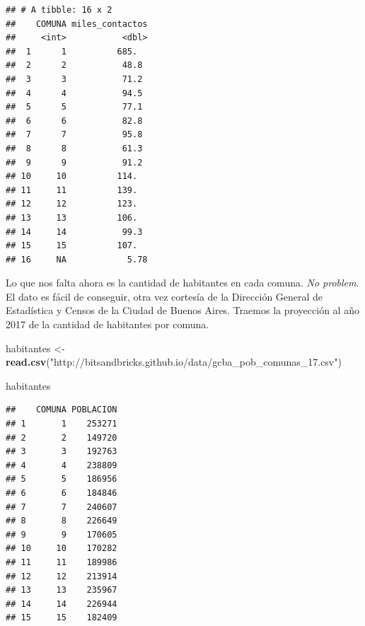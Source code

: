 \documentclass[spanish,]{book}
\newenvironment{Shaded}{\begin{snugshade}}{\end{snugshade}}
\newcommand{\DataTypeTok}[1]{\textcolor[rgb]{0.13,0.29,0.53}{#1}}
\newcommand{\DecValTok}[1]{\textcolor[rgb]{0.00,0.00,0.81}{#1}}
\newcommand{\KeywordTok}[1]{\textcolor[rgb]{0.13,0.29,0.53}{\textbf{#1}}}
\newcommand{\NormalTok}[1]{#1}
\newcommand{\OperatorTok}[1]{\textcolor[rgb]{0.81,0.36,0.00}{\textbf{#1}}}
\newcommand{\StringTok}[1]{\textcolor[rgb]{0.31,0.60,0.02}{#1}}
\begin{document}
\begin{Shaded}
\end{Shaded}

\begin{verbatim}
## # A tibble: 16 x 2
##    COMUNA miles_contactos
##     <int>           <dbl>
##  1      1          685.  
##  2      2           48.8 
##  3      3           71.2 
##  4      4           94.5 
##  5      5           77.1 
##  6      6           82.8 
##  7      7           95.8 
##  8      8           61.3 
##  9      9           91.2 
## 10     10          114.  
## 11     11          139.  
## 12     12          123.  
## 13     13          106.  
## 14     14           99.3 
## 15     15          107.  
## 16     NA            5.78
\end{verbatim}

Lo que nos falta ahora es la cantidad de habitantes en cada comuna. \emph{No problem}. El dato es fácil de conseguir, otra vez cortesía de la Dirección General de Estadística y Censos de la Ciudad de Buenos Aires. Traemos la proyección al año 2017 de la cantidad de habitantes por comuna.

\begin{Shaded}
\begin{Highlighting}[]
\NormalTok{habitantes <-}\StringTok{ }\KeywordTok{read.csv}\NormalTok{(}\StringTok{"http://bitsandbricks.github.io/data/gcba_pob_comunas_17.csv"}\NormalTok{)}

\NormalTok{habitantes}
\end{Highlighting}
\end{Shaded}

\begin{verbatim}
##    COMUNA POBLACION
## 1       1    253271
## 2       2    149720
## 3       3    192763
## 4       4    238809
## 5       5    186956
## 6       6    184846
## 7       7    240607
## 8       8    226649
## 9       9    170605
## 10     10    170282
## 11     11    189986
## 12     12    213914
## 13     13    235967
## 14     14    226944
## 15     15    182409
\end{verbatim}
\end{document}
